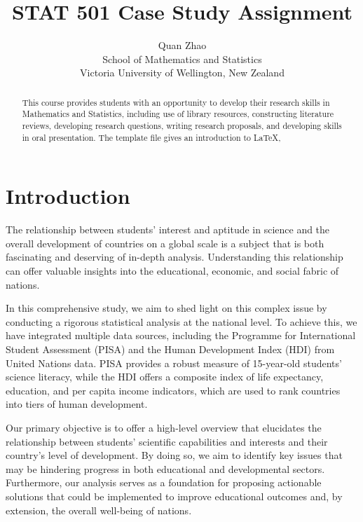 \documentclass[12pt]{article}
\title{STAT 501 Case Study Assignment}
\author{Quan Zhao\\
School of Mathematics and Statistics\\ Victoria University of Wellington, New Zealand}
\begin{document}
\maketitle

\begin{abstract}
  This course provides students with an opportunity to develop their
  research skills in Mathematics and Statistics, including use of
  library resources, constructing literature reviews, developing
  research questions, writing research proposals, and developing
  skills in oral presentation. The template file gives an introduction
  to LaTeX,
\end{abstract}


\tableofcontents


\setlength{\baselineskip}{0.25in} %





\newpage  %
\section{Introduction}

\label{s.intro}

The relationship between students' interest and aptitude in science and the overall development of countries on a global scale is a subject that is both fascinating and deserving of in-depth analysis. Understanding this relationship can offer valuable insights into the educational, economic, and social fabric of nations.

In this comprehensive study, we aim to shed light on this complex issue by conducting a rigorous statistical analysis at the national level. To achieve this, we have integrated multiple data sources, including the Programme for International Student Assessment (PISA) and the Human Development Index (HDI) from United Nations data. PISA provides a robust measure of 15-year-old students' science literacy, while the HDI offers a composite index of life expectancy, education, and per capita income indicators, which are used to rank countries into tiers of human development.

Our primary objective is to offer a high-level overview that elucidates the relationship between students' scientific capabilities and interests and their country's level of development. By doing so, we aim to identify key issues that may be hindering progress in both educational and developmental sectors. Furthermore, our analysis serves as a foundation for proposing actionable solutions that could be implemented to improve educational outcomes and, by extension, the overall well-being of nations.
\end{document}
